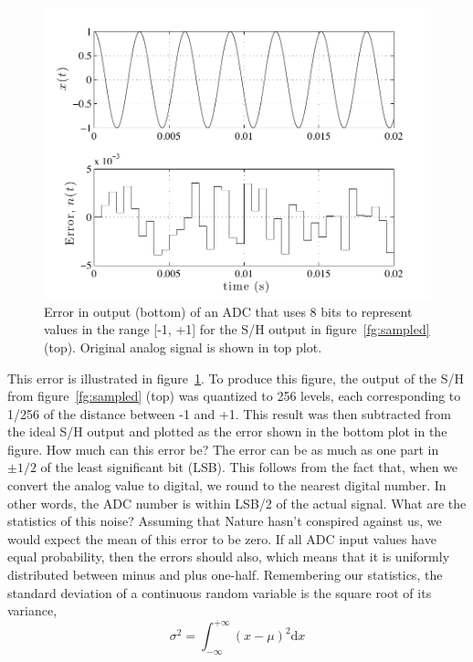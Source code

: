 \begin{figure}
\centerline{\includegraphics[width=\textwidth]{ch-computer/quant-error_2000}}
\caption[Error in output for 8-bit ADC]{Error in output (bottom) of an
ADC that uses 8 bits to represent values in the range [-1, +1] for the
S/H output in figure~\protect\ref{fg:sampled} (top). Original analog
signal is shown in top plot.\label{fg:quant2k}}
\end{figure}

This error is illustrated in figure~\ref{fg:quant2k}. To produce this
figure, the output of the S/H from figure~\ref{fg:sampled} (top) was
quantized to 256 levels, each corresponding to 1/256 of the distance
between -1 and +1. This result was then subtracted from the ideal S/H
output and plotted as the error shown in the bottom plot in the
figure. How much can this error be? The error can be as much as one
part in $\pm 1/2$ of the least significant bit (LSB). This follows
from the fact that, when we convert the analog value to digital, we
round to the nearest digital number. In other words, the ADC number is
within LSB/2 of the actual signal. What are the statistics of this
noise? Assuming that Nature hasn't conspired against us, we would
expect the mean of this error to be zero.  If all ADC input values
have equal probability, then the errors should also, which means that
it is uniformly distributed between minus and plus one-half.
Remembering our statistics, the standard deviation of a continuous
random variable is the square root of its variance,
\begin{equation}
\sigma^2 = \int_{-\infty}^{+\infty} (x-\mu)^2 \mathrm{d}x
\label{eq:var}
\end{equation}

